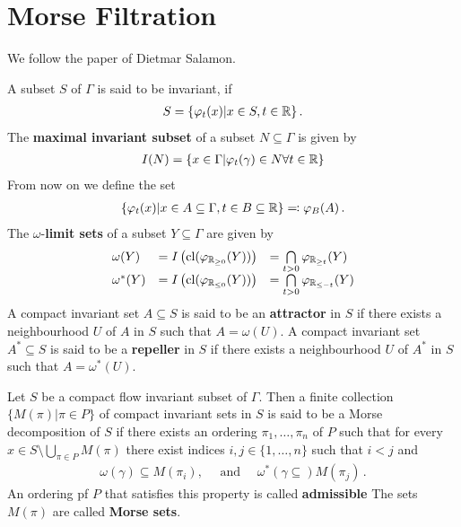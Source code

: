 \section{Morse Filtration}
We follow the paper of Dietmar Salamon.
\begin{definition}
	A subset $S$ of $\Gamma$ is said to be invariant, if 
	\begin{align}
		S=\{\varphi_t(x)|x\in S, t\in \mathbb{R} \} \, .
	\end{align}
	The \textbf{maximal invariant subset} of a subset $N\subseteq \Gamma$ is given by 
	\begin{align}
		I(N)=\{ x \in \Gamma| \varphi _t(\gamma)\in N \forall t\in \mathbb{R} \}
	\end{align} From now on we define the set 
	\begin{align}
		\{\varphi_t(x)| x \in A\subseteq \Gamma,t\in B\subseteq \mathbb{R} \}\eqcolon \varphi_B(A)\, .
	\end{align}The $\omega$-\textbf{limit sets} of a subset $Y\subseteq \Gamma$ are given by
\[
\begin{array}{lll}
	\omega(Y) &= I\left(\operatorname{\mathrm{cl}}(\varphi_{\mathbb{R}_{\geq 0}}(Y))\right) & = \bigcap\limits_{t>0} \varphi_{\mathbb{R}_{\geq t}}(Y) \\
	\omega^*(Y) &= I\left(\operatorname{\mathrm{cl}}(\varphi_{\mathbb{R}_{\leq 0}}(Y))\right) & = \bigcap\limits_{t>0} \varphi_{\mathbb{R}_{\leq -t}}(Y)
\end{array}
\]
A compact invariant set $A\subseteq S$ is said to be an
\textbf{attractor} in $S$ if there exists a neighbourhood $U$ of $A$ in $S$ such that $A=\omega(U)$. A
compact invariant set $A^* \subseteq S$ is said to be a \textbf{repeller} in $S$ if there exists a
neighbourhood $U$ of $A^*$ in $S$ such that $A=\omega^*(U)$.
\end{definition}
\begin{definition}
Let $S$ be a compact flow invariant subset of $\Gamma$. Then a finite collection $\{M(\pi)|\pi\in P\}$ of compact invariant sets in $S$ is said to be a Morse decomposition of $S$ if there exists an ordering $\pi_1,\dots,\pi_n$ of $P$ such that for every $ x \in S \setminus \bigcup_{\pi\in P}M(\pi)$ there exist indices $i,j\in \{1,\dots,n\}$ such that $i<j$ and 
\begin{align}
	\omega(\gamma) \subseteq M(\pi_i),\quad \text{ and } \quad\omega^*(\gamma\subseteq) M(\pi_j) \, .
	\end{align} An ordering pf $P$ that satisfies this property is called \textbf{admissible} The sets $M(\pi)$ are called \textbf{Morse sets}.
\end{definition}
